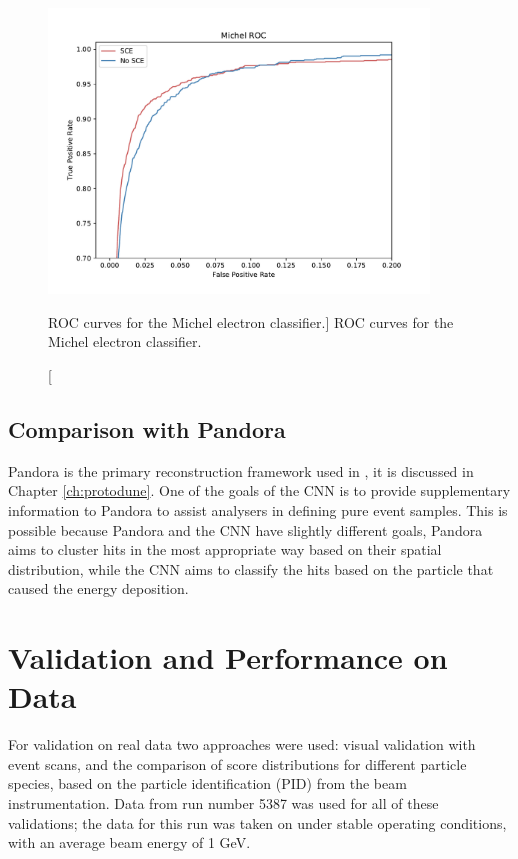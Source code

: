 \begin{figure}
	\centering
	\includegraphics[width=0.9\textwidth]{figures/michel_roc_comparison.pdf}
	\caption
	[ROC curves for the Michel electron classifier.]
	{ROC curves for the Michel electron classifier.}
	\label{fig:michel_roc}
\end{figure}

\subsection{Comparison with Pandora}

Pandora is the primary reconstruction framework used in \protodune{}, it is
discussed in Chapter \ref{ch:protodune}. One of the goals of the CNN is to
provide supplementary information to Pandora to assist analysers in defining 
pure event samples. This is possible because Pandora and the CNN have slightly
different goals, Pandora aims to cluster hits in the most appropriate way based
on their spatial distribution, while the CNN aims to classify the hits based on 
the particle that caused the energy deposition.


\section{Validation and Performance on \protodune{} Data} \label{cnn-perf-data}

For validation on real \protodune{} data two approaches were used: visual
validation with event scans, and the comparison of score distributions for
different particle species, based on the particle identification (PID) from the
beam instrumentation. Data from \protodune{} run number 5387 was used for all of
these validations; the data for this run was taken on under stable operating
conditions, with an average beam energy of 1 GeV.

